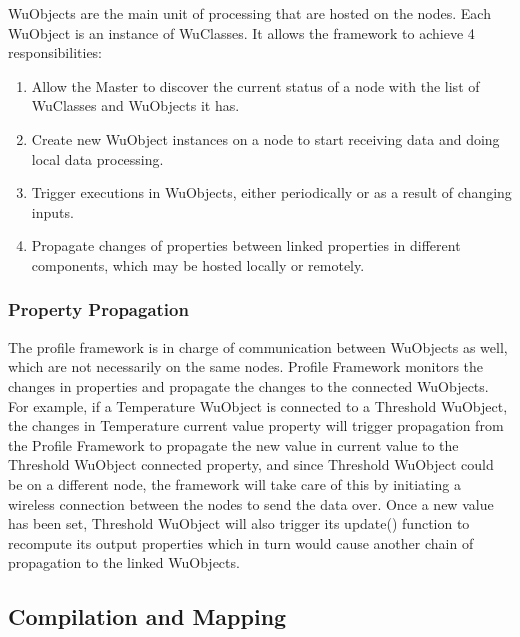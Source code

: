 WuObjects are the main unit of processing that are hosted on the nodes. Each
WuObject is an instance of WuClasses. It allows the framework to achieve
4 responsibilities:
\begin{enumerate}
\item Allow the Master to discover the current status of a node with the list
of WuClasses and WuObjects it has.
\item Create new WuObject instances on a node to start receiving data and doing
local data processing.
\item Trigger executions in WuObjects, either periodically or as a result of
changing inputs.
\item Propagate changes of properties between linked properties in different
components, which may be hosted locally or remotely.
\end{enumerate}

\subsubsection{Property Propagation}

The profile framework is in charge of communication between WuObjects as
well, which are not necessarily on the same nodes. Profile Framework monitors
the changes in properties and propagate the changes to the connected WuObjects.
For example, if a Temperature WuObject is connected to a Threshold WuObject,
the changes in Temperature current value property will trigger propagation from
the Profile Framework to propagate the new value in current value to the
Threshold WuObject connected property, and since Threshold WuObject could be on
a different node, the framework will take care of this by initiating
a wireless connection between the nodes to send the data over. Once a new value
has been set, Threshold WuObject will also trigger its update() function to
recompute its output properties which in turn would cause another chain of
propagation to the linked WuObjects.

\subsection{Compilation and Mapping}

